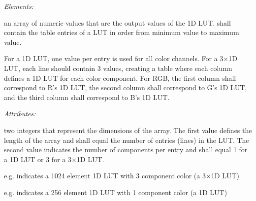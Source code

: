 \emph{Elements:}
\begin{xmlfields}
    \xmlitem[Array][required] an array of numeric values that are the output values of the 1D LUT.   shall contain the table entries of a LUT in order from minimum value to maximum value. 
    
    For a 1D LUT, one value per entry is used for all color channels. For a 3$\times$1D LUT, each line should contain 3 values, creating a table where each column defines a 1D LUT for each color component. For RGB, the first column shall correspond to R's 1D LUT, the second column shall correspond to G's 1D LUT, and the third column shall correspond to B's 1D LUT. 

    \emph{Attributes:}
    \begin{xmlfields}
        \xmlitem[dim][required] 
        two integers that represent the dimensions of the array. The first value defines the length of the array and shall equal the number of entries (lines) in the LUT. The second value indicates the number of components per entry and shall equal 1 for a 1D LUT or 3 for a 3$\times$1D LUT. 
        
        \begin{list}{}{\setlength{\itemsep}{4pt}\setlength{\topsep}{0pt}}
            \item e.g.  indicates a 1024 element 1D LUT with 3 component color (a 3$\times$1D LUT)
            \item e.g.  indicates a 256 element 1D LUT with 1 component color (a 1D LUT)     
        \end{list}
    \end{xmlfields}

    
\end{xmlfields}



